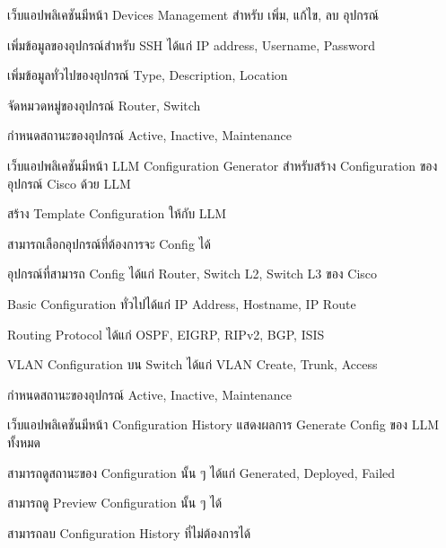 \begin{mycustomenum2}
    \item เว็บแอปพลิเคชันมีหน้า Devices Management สำหรับ เพิ่ม, แก้ไข, ลบ อุปกรณ์
    \begin{mycustomenum2}
        \item เพิ่มข้อมูลของอุปกรณ์สำหรับ SSH ได้แก่ IP address, Username, Password
        \item เพิ่มข้อมูลทั่วไปของอุปกรณ์ Type, Description, Location 
        \item จัดหมวดหมู่ของอุปกรณ์ Router, Switch 
        \item กำหนดสถานะของอุปกรณ์ Active, Inactive, Maintenance
    \end{mycustomenum2}

    \item เว็บแอปพลิเคชันมีหน้า LLM Configuration Generator สำหรับสร้าง Configuration ของอุปกรณ์ Cisco ด้วย LLM 
    \begin{mycustomenum2}
        \item สร้าง Template Configuration ให้กับ LLM
        \item สามารถเลือกอุปกรณ์ที่ต้องการจะ Config ได้  
        \vspace{4em}
        \item อุปกรณ์ที่สามารถ Config ได้แก่ Router, Switch L2, Switch L3 ของ Cisco 
            \begin{mycustomenum2}
                \item Basic Configuration ทั่วไปได้แก่ IP Address, Hostname, IP Route 
                \item Routing Protocol ได้แก่ OSPF, EIGRP, RIPv2, BGP, ISIS 
                \item VLAN Configuration บน Switch ได้แก่ VLAN Create, Trunk, Access 
            \end{mycustomenum2} 
        \item กำหนดสถานะของอุปกรณ์ Active, Inactive, Maintenance
    \end{mycustomenum2}

    \item เว็บแอปพลิเคชันมีหน้า Configuration History แสดงผลการ Generate Config ของ LLM ทั้งหมด 
    \begin{mycustomenum2}
        \item สามารถดูสถานะของ Configuration นั้น ๆ ได้แก่ Generated, Deployed, Failed
        \item สามารถดู Preview Configuration นั้น ๆ ได้ 
        \item สามารถลบ Configuration History ที่ไม่ต้องการได้
    \end{mycustomenum2}


\end{mycustomenum2}
